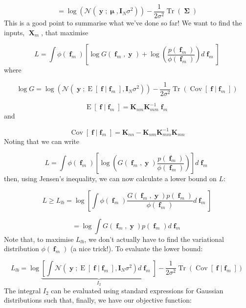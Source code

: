 \documentclass[a4paper, 11pt]{article}
\DeclareMathOperator{\Cov}{Cov}
\DeclareMathOperator{\E}{E}
\DeclareMathOperator{\Tr}{Tr}
\DeclareMathOperator{\X}{\boldsymbol{X}}
\DeclareMathOperator{\y}{\boldsymbol{y}}
\DeclareMathOperator{\f}{\boldsymbol{f}}
\DeclareMathOperator{\bmu}{\boldsymbol{\mu}}
\DeclareMathOperator{\bSigma}{\boldsymbol{\Sigma}}
\begin{document}
\begin{equation}
	= \log(\mathcal{N}(\y;\bmu,\boldsymbol{I}_N\sigma^2)) -\frac{1}{2\sigma^2}\Tr(\bSigma)
\end{equation}
This is a good point to summarise what we've done so far! We want to find the inputs, $\X_m$, that maximise 

\begin{equation}
	L = \int \phi(\f_m) \left[
		\log G(\f_m,\y) + \log \left(  \frac{p(\f_m)}{\phi(\f_m)} \right) d\f_m
	\right]
\end{equation}
where

\begin{equation}
	\log G = \log \left(  \mathcal{N}(\y;\E[\f|\f_m],\boldsymbol{I}_N\sigma^2) \right) -\frac{1}{2\sigma^2}\Tr\left( \Cov[\f|\f_m] \right)
\end{equation}

\begin{equation}
	\E[\f|\f_m] = \boldsymbol{K}_{nm} \boldsymbol{K}_{mm}^{-1} \f_m
\end{equation}
and

\begin{equation}
	\Cov[\f|\f_m] = \boldsymbol{K}_{nn} - \boldsymbol{K}_{nm}\boldsymbol{K}_{mm}^{-1}\boldsymbol{K}_{mn}
\end{equation}
Noting that we can write 

\begin{equation}
	L = \int \phi(\f_m) \left[
		\log \left( G(\f_m,\y)  \frac{p(\f_m)}{\phi(\f_m)} \right)
	\right] d\f_m
\end{equation}
then, using Jensen's inequality, we can now calculate a lower bound on $L$:

\begin{equation}
	L \geq L_{lb} = \log \left[  \int \phi(\f_m) \frac{G(\f_m,\y) p(\f_m)}{\phi(\f_m)}  d\f_m \right]
\end{equation}

\begin{equation}
	= \log \int G(\f_m,\y)p(\f_m) d\f_m
\end{equation}
Note that, to maximise $L_{lb}$, we don't actually have to find the variational distribution $\phi(\f_m)$ (a nice trick!). To evaluate the lower bound:

\begin{equation}
	L_{lb} = \log \underbrace{\left[ \int \mathcal{N}(\y;\E[\f|\f_m],\boldsymbol{I}_N \sigma^2) d\f_m \right]}_{I_2} -\frac{1}{2\sigma^2} \Tr\left( \Cov[\f|\f_m] \right)
\end{equation}
The integral $I_2$ can be evaluated using standard expressions for Gaussian distributions such that, finally, we have our objective function:
\end{document}
